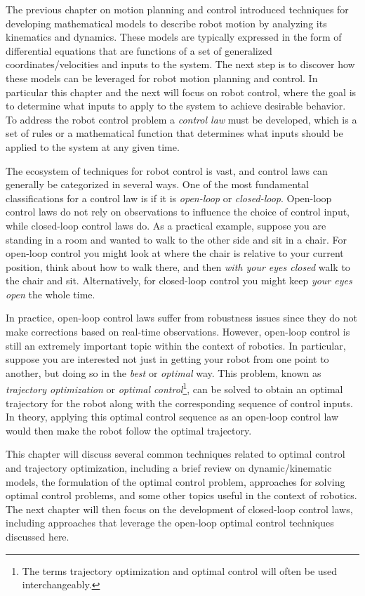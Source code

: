 The previous chapter on motion planning and control introduced techniques for developing mathematical models to describe robot motion by analyzing its kinematics and dynamics. These models are typically expressed in the form of differential equations that are functions of a set of generalized coordinates/velocities and inputs to the system.
The next step is to discover how these models can be leveraged for robot motion planning and control. In particular this chapter and the next will focus on robot control, where the goal is to determine what inputs to apply to the system to achieve desirable behavior. To address the robot control problem a \textit{control law} must be developed, which is a set of rules or a mathematical function that determines what inputs should be applied to the system at any given time.

The ecosystem of techniques for robot control is vast, and control laws can generally be categorized in several ways. One of the most fundamental classifications for a control law is if it is \textit{open-loop} or \textit{closed-loop}. Open-loop control laws do not rely on observations to influence the choice of control input, while closed-loop control laws do. As a practical example, suppose you are standing in a room and wanted to walk to the other side and sit in a chair. For open-loop control you might look at where the chair is relative to your current position, think about how to walk there, and then \textit{with your eyes closed} walk to the chair and sit. Alternatively, for closed-loop control you might keep \textit{your eyes open} the whole time.

In practice, open-loop control laws suffer from robustness issues since they do not make corrections based on real-time observations. However, open-loop control is still an extremely important topic within the context of robotics.
In particular, suppose you are interested not just in getting your robot from one point to another, but doing so in the \textit{best} or \textit{optimal} way. This problem, known as \textit{trajectory optimization} or \textit{optimal control}\footnote{The terms trajectory optimization and optimal control will often be used interchangeably.}, can be solved to obtain an optimal trajectory for the robot along with the corresponding sequence of control inputs. In theory, applying this optimal control sequence as an open-loop control law would then make the robot follow the optimal trajectory. 

This chapter will discuss several common techniques related to optimal control and trajectory optimization, including a brief review on dynamic/kinematic models, the formulation of the optimal control problem, approaches for solving optimal control problems, and some other topics useful in the context of robotics. The next chapter will then focus on the development of closed-loop control laws, including approaches that leverage the open-loop optimal control techniques discussed here.

